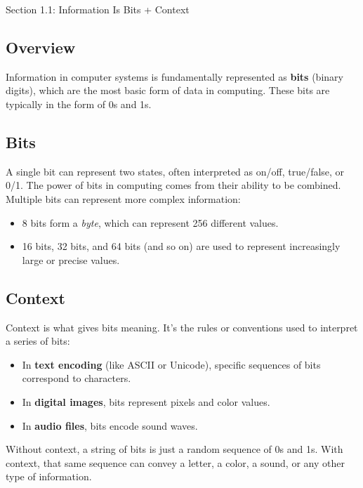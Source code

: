 \begin{notes}{Section 1.1: Information Is Bits + Context}
    \subsection*{Overview}

    Information in computer systems is fundamentally represented as \textbf{bits} (binary digits), which are the most basic form of data in computing. These bits are typically in the form of 0s and 1s. \vspace*{1em}
    
    \subsection*{Bits}

    A single bit can represent two states, often interpreted as on/off, true/false, or 0/1. The power of bits in computing comes from their ability to be combined. Multiple bits can represent more complex 
    information:

    \begin{itemize}
        \item 8 bits form a \textit{byte}, which can represent 256 different values.
        \item 16 bits, 32 bits, and 64 bits (and so on) are used to represent increasingly large or precise values.
    \end{itemize}
    
    \subsection*{Context}

    Context is what gives bits meaning. It's the rules or conventions used to interpret a series of bits:

    \begin{itemize}
        \item In \textbf{text encoding} (like ASCII or Unicode), specific sequences of bits correspond to characters.
        \item In \textbf{digital images}, bits represent pixels and color values.
        \item In \textbf{audio files}, bits encode sound waves.
    \end{itemize}

    Without context, a string of bits is just a random sequence of 0s and 1s. With context, that same sequence can convey a letter, a color, a sound, or any other type of information.
    

\end{notes}
